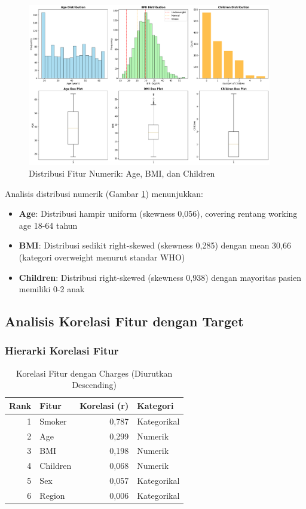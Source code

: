 \begin{figure}[H]
\centering
\includegraphics[width=0.95\textwidth]{../results/plots/03_numerical_features.png}
\caption{Distribusi Fitur Numerik: Age, BMI, dan Children}
\label{fig:numerical-features}
\end{figure}

Analisis distribusi numerik (Gambar \ref{fig:numerical-features}) menunjukkan:
\begin{itemize}
    \item \textbf{Age}: Distribusi hampir uniform (skewness 0,056), covering rentang working age 18-64 tahun
    \item \textbf{BMI}: Distribusi sedikit right-skewed (skewness 0,285) dengan mean 30,66 (kategori overweight menurut standar WHO)
    \item \textbf{Children}: Distribusi right-skewed (skewness 0,938) dengan mayoritas pasien memiliki 0-2 anak
\end{itemize}

\subsection{Analisis Korelasi Fitur dengan Target}
\label{subsec:analisis-korelasi}

\subsubsection{Hierarki Korelasi Fitur}

\begin{table}[H]
\centering
\caption{Korelasi Fitur dengan Charges (Diurutkan Descending)}
\label{tab:correlation-ranking}
\begin{tabular}{|r|l|r|l|}
\hline
\textbf{Rank} & \textbf{Fitur} & \textbf{Korelasi (r)} & \textbf{Kategori} \\
\hline
1 & Smoker & 0,787 & Kategorikal \\
2 & Age & 0,299 & Numerik \\
3 & BMI & 0,198 & Numerik \\
4 & Children & 0,068 & Numerik \\
5 & Sex & 0,057 & Kategorikal \\
6 & Region & 0,006 & Kategorikal \\
\hline
\end{tabular}
\end{table}

